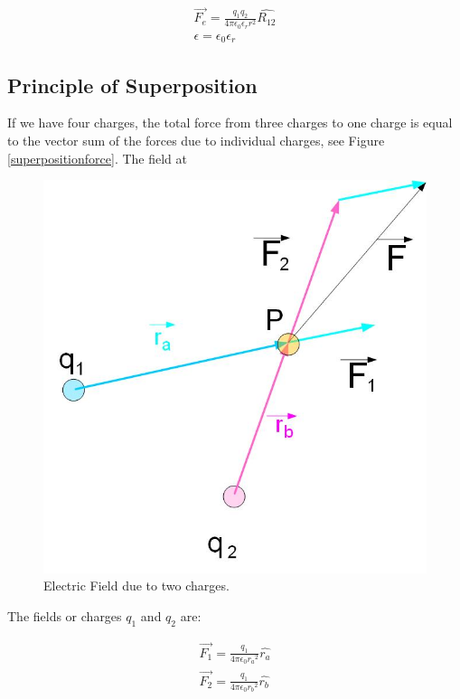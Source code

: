 \documentclass{ximera}
\begin{document}
\begin{eqnarray}
\vec{F_e}=\frac{q_1 q_2}{4 \pi \epsilon_0 \epsilon_r r^2} \hat{R_{12}} \label{EqCoulombslaw3} \\
\epsilon = \epsilon_0 \epsilon_r
\end{eqnarray}



\subsection{Principle of Superposition}

If we have four charges, the total force from three charges to one charge is equal to the vector sum of the forces due to individual charges, see Figure \ref{superpositionforce}.  The field at



\begin{figure}[htbp]
\begin{center}
\includegraphics[scale=0.5]{../jpg/superpositionFORCE.jpg}
\end{center}
\caption{Electric Field due to two charges.}
\label{UnitCh}
\end{figure}

The fields or charges $q_1$ and $q_2$ are:

\begin{eqnarray}
\vec{F_1}=\frac{q_1}{4 \pi \epsilon_{0} {r_a}^2} \hat{r_a} \label{field}\\
\vec{F_2}=\frac{q_1}{4 \pi \epsilon_{0} {r_b}^2} \hat{r_b}
\end{eqnarray}
\end{document}
